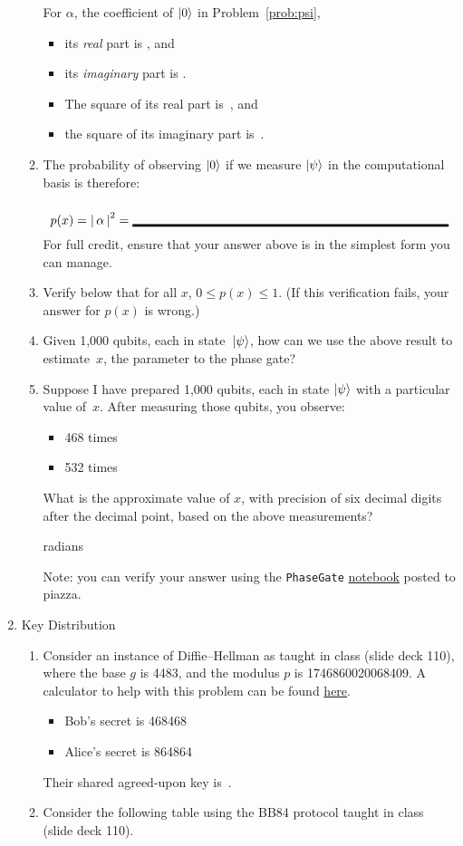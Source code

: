 \documentclass[12pt]{article}
\begin{document}
\begin{enumerate}
\begin{enumerate}[label=\theenumi.\arabic*]
  For $\alpha$, the coefficient of $\ket{0}$ in Problem~\ref{prob:psi},
  \begin{itemize}
      \item its \emph{real} part is \Blank[20em]{}, and
      \item its \emph{imaginary} part is \Blank[20em]{}.
      \item The square of its real part is~\Blank[20em]{}, and
      \item the square of its imaginary part is~\Blank[20em]{}.
  \end{itemize}
  \item\label{prob:prob} The probability of observing $\ket{0}$ if we measure $\ket{\psi}$ in the computational basis is therefore:
  \[
  p(x) = \Prob{\alpha} = \Blank[25em]{}
  \]
  For full credit, ensure that your answer above is in the simplest form you can manage.
  \item Verify below that for all $x$, $0 \leq p(x) \leq 1$.  (If this verification fails, your answer for $p(x)$ is wrong.)
  \LeaveSpace{}
  \item Given 1,000 qubits, each in state~$\ket{\psi}$, how can we use the above result to estimate~$x$, the parameter to the phase gate?
  \LeaveSpace{}
  \item Suppose I have prepared 1,000 qubits, each in state $\ket{\psi}$ with a particular value of~$x$. After measuring those qubits, you observe:
  \begin{itemize}
      \item \QZero{} 468 times
      \item \QOne{} 532 times
  \end{itemize}
  What is the approximate value of $x$, with precision of six decimal digits after the decimal point, based on the above measurements?
  
  \Blank[15em]{} radians

  Note: you can verify your answer using the \texttt{PhaseGate} \href{https://piazza.com/class/m5mjpzl3hch1cf/post/76}{notebook} posted to piazza.
\end{enumerate}
\item {} Key Distribution
\begin{enumerate}[label=\theenumi.\arabic*]
    \item Consider an instance of Diffie--Hellman as taught in class (slide deck 110), where the base $g$ is 4483, and the modulus $p$ is 1746860020068409.  A calculator to help with this problem can be found \href{https://www.boxentriq.com/code-breaking/modular-exponentiation}{here}.
    \begin{itemize}
        \item Bob's secret is 468468
        \item Alice's secret is 864864
    \end{itemize}
    Their shared agreed-upon key is~\Blank[20em]{}.
    \item Consider the following table using the BB84 protocol taught in class (slide deck 110).


\end{enumerate}
\end{enumerate}
\end{document}
